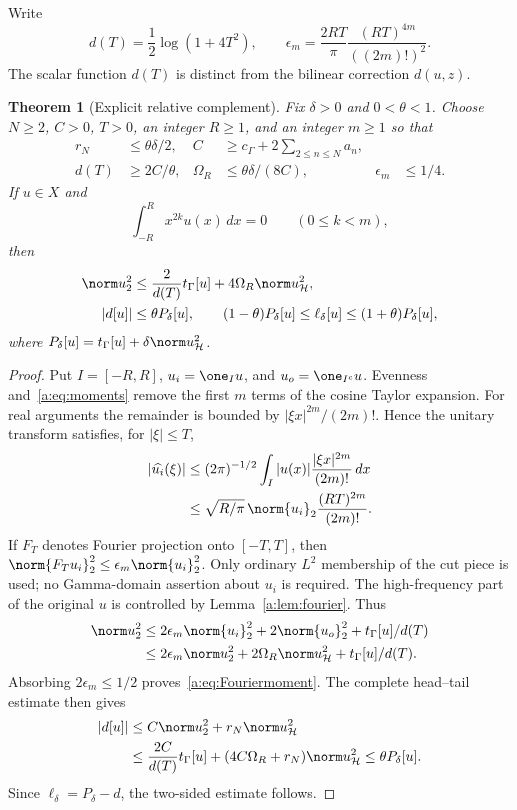 \documentclass[11pt,a4paper]{article}
\numberwithin{equation}{section}
\newtheorem{theorem}{Theorem}[section]
\theoremstyle{definition}\newtheorem{definition}[theorem]{Definition}
\theoremstyle{remark}\newtheorem{remark}[theorem]{Remark}
\newcommand{\Hh}{\mathcal H}\newcommand{\Hw}{\mathcal H}
\newcommand{\tg}{t_\Gamma}\newcommand{\cg}{c_\Gamma}
\begin{document}
Write
\[
 d(T)=\frac12\log(1+4T^2),\qquad
 \epsilon_m=\frac{2RT}{\pi}\frac{(RT)^{4m}}{((2m)!)^2}.
\]
The scalar function $d(T)$ is distinct from the bilinear correction $d(u,z)$.

\begin{theorem}[Explicit relative complement]\label{a:thm:moment}
Fix $\delta>0$ and $0<\theta<1$. Choose $N\ge2$, $C>0$, $T>0$, an integer $R\ge1$, and an integer $m\ge1$ so that
\begin{align}
 r_N&\le\theta\delta/2,&
 C&\ge\cg+2\sum_{2\le n\le N}a_n,\label{a:eq:choices1}\\
 d(T)&\ge2C/\theta,&
 \Omega_R&\le\theta\delta/(8C),&
 \epsilon_m&\le1/4.\label{a:eq:choices2}
\end{align}
If $u\in X$ and
\begin{equation}\label{a:eq:moments}
 \int_{-R}^Rx^{2k}u(x)\,dx=0\qquad(0\le k<m),
\end{equation}
then
\begin{align}
 \norm u_2^2&\le\frac2{d(T)}\tg[u]+4\Omega_R\norm u_{\Hh}^2,
                   \label{a:eq:Fouriermoment}\\
 |d[u]|&\le\theta P_\delta[u],\qquad
 (1-\theta)P_\delta[u]\le\ell_\delta[u]
                \le(1+\theta)P_\delta[u],\label{a:eq:relative}
\end{align}
where $P_\delta[u]=\tg[u]+\delta\norm u_{\Hh}^2$.
\end{theorem}
\begin{proof}
Put $I=[-R,R]$, $u_i=\one_Iu$, and $u_o=\one_{I^c}u$. Evenness and~\eqref{a:eq:moments} remove the first $m$ terms of the cosine Taylor expansion. For real arguments the remainder is bounded by $|\xi x|^{2m}/(2m)!$. Hence the unitary transform satisfies, for $|\xi|\le T$,
\begin{align*}
 |\widehat{u_i}(\xi)|
 &\le(2\pi)^{-1/2}\int_I|u(x)|\frac{|\xi x|^{2m}}{(2m)!}\,dx\\
 &\le\sqrt{R/\pi}\,\norm{u_i}_2\frac{(RT)^{2m}}{(2m)!}.
\end{align*}
If $F_T$ denotes Fourier projection onto $[-T,T]$, then
$\norm{F_Tu_i}_2^2\le\epsilon_m\norm{u_i}_2^2$.
Only ordinary $L^2$ membership of the cut piece is used; no Gamma-domain assertion about $u_i$ is required. The high-frequency part of the original $u$ is controlled by Lemma~\ref{a:lem:fourier}. Thus
\begin{align*}
 \norm u_2^2
 &\le2\epsilon_m\norm{u_i}_2^2+2\norm{u_o}_2^2
                     +\tg[u]/d(T)\\
 &\le2\epsilon_m\norm u_2^2+2\Omega_R\norm u_{\Hh}^2
                     +\tg[u]/d(T).
\end{align*}
Absorbing $2\epsilon_m\le1/2$ proves~\eqref{a:eq:Fouriermoment}.
The complete head--tail estimate then gives
\begin{align*}
 |d[u]|&\le C\norm u_2^2+r_N\norm u_{\Hh}^2\\
 &\le\frac{2C}{d(T)}\tg[u]+(4C\Omega_R+r_N)\norm u_{\Hh}^2
 \le\theta P_\delta[u].
\end{align*}
Since $\ell_\delta=P_\delta-d$, the two-sided estimate follows.
\end{proof}
\end{document}
